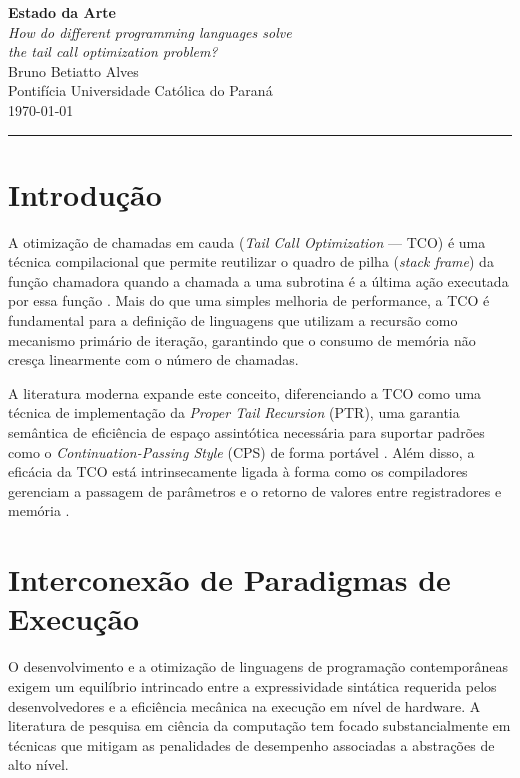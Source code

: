 \documentclass[12pt, a4paper]{article}
\begin{document}
\begin{center}
  {\LARGE\bfseries Estado da Arte} \\[0.4em]
  {\large\itshape How do different programming languages solve\\
  the tail call optimization problem?} \\[1em]
  {\normalsize Bruno Betiatto Alves} \\
  {\small Pontifícia Universidade Católica do Paraná} \\
  {\small \today}
\end{center}

\vspace{1em}
\hrule
\vspace{1.5em}

\section{Introdução}

A otimização de chamadas em cauda (\textit{Tail Call Optimization} — TCO) é uma técnica compilacional que permite reutilizar o quadro de pilha (\textit{stack frame}) da função chamadora quando a chamada a uma subrotina é a última ação executada por essa função \autocite{steele1977}. Mais do que uma simples melhoria de performance, a TCO é fundamental para a definição de linguagens que utilizam a recursão como mecanismo primário de iteração, garantindo que o consumo de memória não cresça linearmente com o número de chamadas.

A literatura moderna expande este conceito, diferenciando a TCO como uma técnica de implementação da \textit{Proper Tail Recursion} (PTR), uma garantia semântica de eficiência de espaço assintótica necessária para suportar padrões como o \textit{Continuation-Passing Style} (CPS) de forma portável \autocite{clinger1998}. Além disso, a eficácia da TCO está intrinsecamente ligada à forma como os compiladores gerenciam a passagem de parâmetros e o retorno de valores entre registradores e memória \autocite{bigot1999}.

\section{Interconexão de Paradigmas de Execução} 
O desenvolvimento e a otimização de linguagens de programação contemporâneas exigem um equilíbrio intrincado entre a expressividade sintática requerida pelos desenvolvedores e a eficiência mecânica na execução em nível de hardware. A literatura de pesquisa em ciência da computação tem focado substancialmente em técnicas que mitigam as penalidades de desempenho associadas a abstrações de alto nível. 
\end{document}
